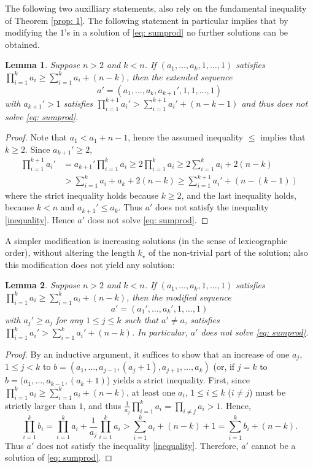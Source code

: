 \documentclass[10pt]{article}
\newtheorem{lemma}{Lemma}
\theoremstyle{definition}
\theoremstyle{remark}
\numberwithin{equation}{section}
\begin{document}
The following two auxilliary statements, also rely on the fundamental inequality of Theorem \ref{prop: 1}. The following statement in particular implies that by modifying the $1$'s in a solution of \eqref{eq: sumprod} no further solutions can be obtained.
\begin{lemma}\label{lem: 2}
Suppose $n>2$ and $k<n$. If $(a_1,\dots,a_k,1,\dots,1)$ satisfies $\prod_{i=1}^k a_i\geq\sum_{i=1}^k a_i+(n-k)$, then the extended sequence 
$$a'=(a_1,\dots,a_k,a_{k+1}',1,1,\dots,1)
$$
with $a_{k+1}'>1$ satisfies $\prod_{i=1}^{k+1} a_i'>\sum_{i=1}^{k+1} a_i'+(n-k-1)$ and thus does not solve \eqref{eq: sumprod}.
\end{lemma}
\begin{proof}
Note that $a_1<a_1+n-1$, hence the assumed inequality $\leq$ implies that $k\geq 2$. Since $a_{k+1}'\geq 2$,
\begin{align*}
\prod_{i=1}^{k+1}a_i'&=a_{k+1}'\prod_{i=1}^k a_i\geq 2 \prod_{i=1}^k a_i\geq 2\sum_{i=1}^k a_i+2(n-k)\\&> \sum_{i=1}^{k} a_i+a_k+2(n-k)\geq\sum_{i=1}^{k+1} a_i'+(n-(k-1))
\end{align*}
where the strict inequality holds because $k\geq 2$, and the last inequality holds, because $k<n$ and $a_{k+1}'\leq a_k$. Thus $a'$ does not satisfy the inequality \eqref{inequality}. Hence $a'$ does not solve \eqref{eq: sumprod}.
\end{proof}


A simpler modification is increasing solutions (in the sense of lexicographic order), without altering the length $k_\star$ of the non-trivial part of the solution; also this modification does not yield any solution:
\begin{lemma}\label{lem: 2x}
Suppose $n>2$ and $k<n$. If $(a_1,\dots,a_k,1,\dots,1)$ satisfies $\prod_{i=1}^k a_i\geq\sum_{i=1}^k a_i+(n-k)$, then the modified sequence 
$$a'=(a_1',\dots,a_k',1,\dots,1)
$$
with $a_{j}'\geq a_j$ for any $1\leq j\leq k$ such that $a'\neq a$, satisfies  $\prod_{i=1}^k a_i'>\sum_{i=1}^k a_i'+(n-k)$. In particular, $a'$ does not solve \eqref{eq: sumprod}.
\end{lemma}
\begin{proof}
By an inductive argument, it suffices to show that an increase of one $a_j$, $1\leq j<k$ to $b=(a_1,\dots,a_{j-1}, (a_j+1),a_{j+1},\dots, a_k)$ (or, if $j=k$ to $b=(a_1,\dots,a_{k-1}, (a_k+1)$) yields a strict inequality. First, since $\prod_{i=1}^k a_i\geq\sum_{i=1}^k a_i+(n-k)$, at least one $a_i$, $1\leq i\leq k$ ($i\neq j$) must be strictly larger than $1$, and thus
$\frac{1}{a_j}\prod_{i=1}^k a_i=\prod_{i\neq j}a_i>1$. Hence,
$$
\prod_{i=1}^k b_i=\prod_{i=1}^k a_i+\frac{1}{a_j}\prod_{i=1}^k a_i>\sum_{i=1}^k a_i+(n-k)+1=\sum_{i=1}^k b_i+(n-k).
$$
Thus $a'$ does not satisfy the inequality \eqref{inequality}. Therefore, $a'$ cannot be a solution of \eqref{eq: sumprod}.
\end{proof}
\end{document}

